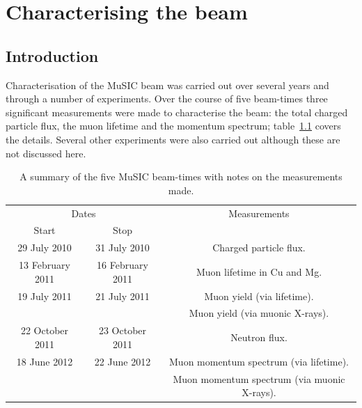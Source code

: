 \part{Characterising the beam} %
\label{prt:characterising_the_beam}
\chapter{Introduction} %
\label{cha:introduction}
Characterisation of the MuSIC beam was carried out over several years and through a number of experiments. Over the course of five beam-times three significant measurements were made to characterise the beam: the total charged particle flux, the muon lifetime and the momentum spectrum; table~\ref{tab:summary_music_beam_time} covers the details. Several other experiments were also carried out although these are not discussed here.
\begin{table}[htpb]
  \begin{center}
  \begin{tabular}{c|c|c}
    \multicolumn{2}{c|}{Dates}          & Measurements                                \\
    Start            & Stop             &                                             \\
    \hline                                                                             
    29 July 2010     & 31 July 2010     & Charged particle flux.                      \\
    13 February 2011 & 16 February 2011 & Muon lifetime in Cu and Mg.                 \\
    19 July 2011     & 21 July 2011     & Muon yield (via lifetime).                  \\
                     &                  & Muon yield (via muonic X-rays).             \\
    22 October 2011  & 23 October 2011  & Neutron flux.                               \\
    18 June 2012     & 22 June 2012     & Muon momentum spectrum (via lifetime).      \\
                     &                  & Muon momentum spectrum (via muonic X-rays). \\
  \end{tabular}
  \end{center}
  \caption{A summary of the five MuSIC beam-times with notes on the measurements made.}
  \label{tab:summary_music_beam_time}
\end{table}

